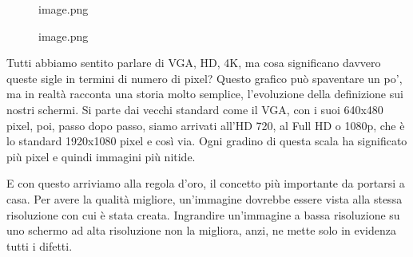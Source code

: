 \documentclass[
]{article}
\begin{document}
\begin{figure}
\centering
{image.png}
\caption{image.png}
\end{figure}

Tutti abbiamo sentito parlare di VGA, HD, 4K, ma cosa significano davvero queste sigle in termini di numero di pixel? Questo grafico può spaventare un po', ma in realtà racconta una storia molto semplice, l'evoluzione della definizione sui nostri schermi. Si parte dai vecchi standard come il VGA, con i suoi 640x480 pixel, poi, passo dopo passo, siamo arrivati all'HD 720, al Full HD o 1080p, che è lo standard 1920x1080 pixel e così via. Ogni gradino di questa scala ha significato più pixel e quindi immagini più nitide.

E con questo arriviamo alla regola d'oro, il concetto più importante da portarsi a casa. Per avere la qualità migliore, un'immagine dovrebbe essere vista alla stessa risoluzione con cui è stata creata. Ingrandire un'immagine a bassa risoluzione su uno schermo ad alta risoluzione non la migliora, anzi, ne mette solo in evidenza tutti i difetti.
\end{document}
